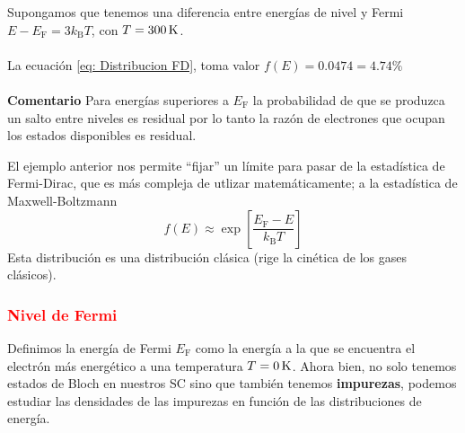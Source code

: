 \begin{tcolorbox}[colback=airforceblue!20, colframe=airforceblue, title=Ejemplo]
Supongamos que tenemos una diferencia entre energías de nivel y Fermi $E-E_\mathrm{F}=3k_\mathrm{B}T$, con $T=\unit[300]{K}$.\\\\
La ecuación \ref{eq: Distribucion FD}, toma valor $f(E)=0.0474= 4.74 \%$
\\\\
\textbf{\textcolor{airforceblue}{Comentario}} Para energías superiores a $E_\mathrm{F}$ la probabilidad de que se produzca un salto entre niveles es residual por lo tanto la razón de electrones que ocupan los estados disponibles es residual.
\end{tcolorbox}
\noindent El ejemplo anterior nos permite ``fijar'' un límite para pasar de la estadística de Fermi-Dirac, que es más compleja de utlizar matemáticamente; a la estadística de Maxwell-Boltzmann
\begin{equation}
    f(E)\approx \exp \left[\frac{E_\mathrm{F}-E}{k_\mathrm{B}T}\right]
\end{equation}
Esta distribución es una distribución clásica (rige la cinética de los gases clásicos). 
\subsubsection{\textcolor{red}{Nivel de Fermi}} \label{sec: Nivel de Fermi}
\noindent Definimos la energía de Fermi $E_\mathrm{F}$ como la energía a la que se encuentra el electrón más energético a una temperatura $T=\unit[0]{K}$.
\newpage
Ahora bien, no solo tenemos estados de Bloch en nuestros SC sino que también tenemos \textbf{impurezas}, podemos estudiar las densidades de las impurezas en función de las distribuciones de energía.

